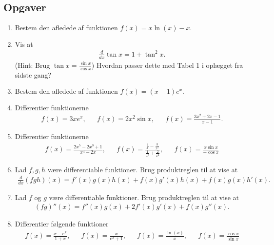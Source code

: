 \subsection{Opgaver}

\begin{enumerate}
	\item \label{it:diff23}Bestem den afledede af funktionen $f(x)=x\ln(x)-x$.
	
	\item\label{it:diff21} Vis at 
	\begin{align*}
	\frac{d}{dx} \tan x= 1+\tan^2x.
	\end{align*}
	(Hint: Brug $\tan x=\frac{\sin x}{\cos x}$)
	Hvordan passer dette med Tabel 1 i oplægget fra sidste gang?

	\item \label{it:diff24} Bestem den afledede af funktionen $f(x)=(x-1)e^x$.
	
	\item Differentier funktionerne
	\begin{align*}
	f(x)=3xe^x,&& f(x)=2x^2\sin x,&& f(x)=\frac{3x^2+2x-1}{x-1}.
	\end{align*}
	
	
	\item Differentier funktionerne
	\begin{align*}
	f(x)=\frac{2x^5-2x^3+1}{x^4-2x},&& f(x)=\frac{\frac{2}{x}-\frac{3}{x^2}}{\frac{1}{x^3}+\frac{2}{x^4}},&& f(x)=\frac{x\sin x}{-\cos x}
	\end{align*} 
	
	
	\item Lad $f,g,h$ være differentiable funktioner. Brug produktreglen til at vise at 
	\begin{align*}
	\frac{d}{dx} (fgh)(x)=f'(x)g(x)h(x)+f(x)g'(x)h(x)+f(x)g(x)h'(x).
	\end{align*}
	
	
	
	
	\item Lad $f$ og $g$ være differentiable funktioner. Brug produktreglen til at vise at
	\begin{align*}
	(fg)''(x)=f''(x)g(x)+2f'(x)g'(x)+f(x)g''(x).
	\end{align*}
	
	\item Differentier følgende funktioner
	\begin{align*}
	f(x)=\frac{x-e^x}{1+x},&&f(x)=\frac{x}{e^x+1},&&f(x)=\frac{\ln(x)}{x},&& f(x)=\frac{\cos x}{\sin x}
	\end{align*}
	

\end{enumerate}
